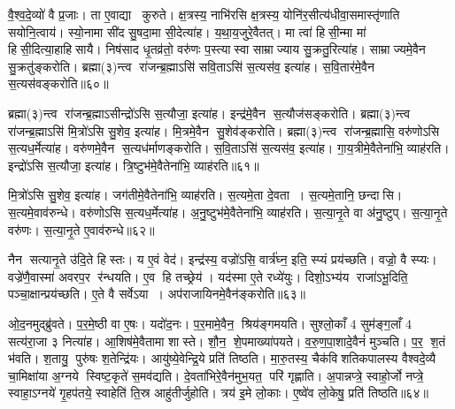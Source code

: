 वै॒श्व॒दे॒व्यो॑ वै प्र॒जाः। ता ए॒वाद्या कुरुते। क्ष॒त्रस्य॒ नाभि॑रसि क्ष॒त्रस्य॒ योनि॑र॒सीत्य॑धीवा॒समास्तृ॑णाति सयोनि॒त्वाय॑। स्यो॒नामा सी॑द सु॒षदा॒मा सी॒देत्या॑ह। य॒था॒य॒जुरे॒वैतत्। मा त्वा॑ हिसी॒न्मा मा॑ हिसी॒दित्या॒हाहिसायै। निष॑साद धृ॒तव्र॑तो॒ वरु॑णः प॒स्त्यास्वा साम्राज्याय सु॒क्रतु॒रित्या॑ह। साम्राज्यमे॒वैन सु॒क्रतु॑ङ्करोति। ब्रह्मा(३)न्त्व रा॑जन्ब्र॒ह्माऽसि॑ सवि॒ताऽसि॑ स॒त्यस॑व॒ इत्या॑ह। स॒वि॒तार॑मे॒वैन स॒त्यस॑वङ्करोति॥६०॥

ब्रह्मा(३)न्त्व रा॑जन्ब्र॒ह्माऽसीन्द्रो॑ऽसि स॒त्यौजा॒ इत्या॑ह। इन्द्र॑मे॒वैन स॒त्यौज॑सङ्करोति। ब्रह्मा(३)न्त्व रा॑जन्ब्र॒ह्माऽसि॑ मि॒त्रो॑ऽसि सु॒शेव॒ इत्या॑ह। मि॒त्रमे॒वैन सु॒शेव॑ङ्करोति। ब्रह्मा(३)न्त्व रा॑जन्ब्र॒ह्मासि॒ वरु॑णोऽसि स॒त्यध॒र्मेत्या॑ह। वरु॑णमे॒वैन स॒त्यध॑र्माणङ्करोति। स॒वि॒ताऽसि॑ स॒त्यस॑व॒ इत्या॑ह। गा॒य॒त्रीमे॒वैतेना॑भि॒ व्याह॑रति। इन्द्रो॑ऽसि स॒त्यौजा॒ इत्या॑ह। त्रि॒ष्टुभ॑मे॒वैतेना॑भि॒ व्याह॑रति॥६१॥

मि॒त्रो॑ऽसि सु॒शेव॒ इत्या॑ह। जग॑तीमे॒वैतेना॑भि॒ व्याह॑रति। स॒त्यमे॒ता दे॒वता। स॒त्यमे॒तानि॒ छन्दासि। स॒त्यमे॒वाव॑रुन्धे। वरु॑णोऽसि स॒त्यध॒र्मेत्या॑ह। अ॒नु॒ष्टुभ॑मे॒वैतेना॑भि॒ व्याह॑रति। स॒त्या॒नृ॒ते वा अ॑नु॒ष्टुप्। स॒त्या॒नृ॒ते वरु॑णः। स॒त्या॒नृ॒ते ए॒वाव॑रुन्धे॥६२॥

नैन सत्यानृ॒ते उ॑दि॒ते हिस्तः। य ए॒वं वेद॑। इन्द्र॑स्य॒ वज्रो॑ऽसि॒ वार्त्र॑घ्न॒ इति॒ स्प्यं प्रय॑च्छति। वज्रो॒ वै स्प्यः। वज्रे॑णै॒वास्मा॑ अवरप॒र र॑न्धयति। ए॒व हि तच्छ्रेय॑। यद॑स्मा ए॒ते रध्ये॑युः। दिशो॒ऽभ्य॑य राजा॑ऽभू॒दिति॒ पञ्चा॒क्षान्प्रय॑च्छति। ए॒ते वै सर्वेऽया। अप॑राजायिनमे॒वैन॑ङ्करोति॥६३॥

ओ॒द॒नमुद्ब्रु॑वते। प॒र॒मे॒ष्ठी वा ए॒षः। यदो॑द॒नः। प॒र॒मामे॒वैन॒ श्रिय॑ङ्गमयति। सुश्लो॒काँ 4 सुम॑ङ्ग॒लाँ 4 सत्य॑रा॒जा ३ नित्या॑ह। आ॒शिष॑मे॒वैतामा शास्ते। शौ॒न॒ शे॒पमाख्या॑पयते। व॒रु॒ण॒पा॒शादे॒वैनं॑ मुञ्चति। प॒र॒ श॒तं भ॑वति। श॒तायु॒ पुरु॑षः श॒तेन्द्रि॑यः। आयु॑ष्ये॒वेन्द्रि॒ये प्रति॑ तिष्ठति। मा॒रु॒तस्य॒ चैक॑विशतिकपालस्य वैश्वदे॒व्यै चा॒मिक्षा॑या अ॒ग्नये स्विष्ट॒कृते॑ स॒मव॑द्यति। दे॒वता॑भिरे॒वैन॑मुभ॒यत॒ परि॑ गृह्णाति। अ॒पान्नप्त्रे॒ स्वाहो॒र्जो नप्त्रे॒ स्वाहा॒ऽग्नये॑ गृ॒हप॑तये॒ स्वाहेति॑ ति॒स्र आहु॑तीर्जुहोति। त्रय॑ इ॒मे लो॒काः। ए॒ष्वे॑व लो॒केषु॒ प्रति॑ तिष्ठति॥६४॥


